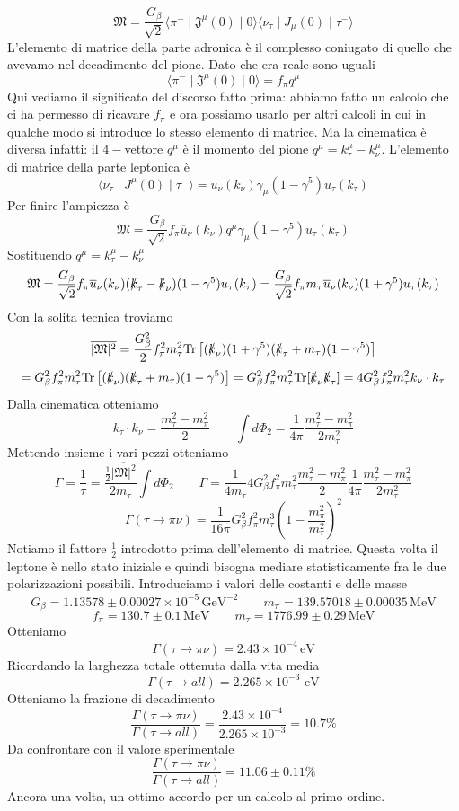 $$
\mathfrak{M} = \frac{G_\beta}{\sqrt{2}} \langle \pi^- \mid \mathfrak{J}^\mu (0) \mid 0 \rangle \langle \nu_\tau \mid J_\mu (0) \mid \tau^- \rangle
$$
L'elemento di matrice della parte adronica è il complesso coniugato di quello che avevamo nel decadimento del pione. Dato che era reale sono uguali
$$
\langle \pi^- \mid \mathfrak{J}^\mu (0) \mid 0 \rangle = f_\pi q^\mu
$$
Qui vediamo il significato del discorso fatto prima: abbiamo fatto un calcolo che ci ha permesso di ricavare $f_\pi$ e ora possiamo usarlo per altri calcoli in cui in qualche modo si introduce lo stesso elemento di matrice. Ma la cinematica è diversa infatti: il $4-$vettore $q^\mu$ è il momento del pione $q^\mu=k_\tau^\mu-k_\nu^\mu$. L'elemento di matrice della parte leptonica è
$$
\langle \nu_\tau \mid J^\mu (0) \mid \tau^- \rangle = \overline{u}_\nu (k_\nu) \gamma_\mu (1 - \gamma^5) u_\tau (k_\tau)
$$
Per finire l'ampiezza è
$$
\mathfrak{M} = \frac{G_\beta}{\sqrt{2}} f_\pi \overline{u}_\nu (k_\nu) q^\mu \gamma_\mu (1 - \gamma^5) u_\tau (k_\tau)
$$
Sostituendo $q^\mu=k_\tau^\mu-k_\nu^\mu$
$$
\mathfrak{M} = \frac{G_\beta}{\sqrt{2}} f_\pi \overline{u}_\nu (k_\nu) (\slashed{k}_\tau - \slashed{k}_\nu) (1 - \gamma^5) u_\tau (k_\tau) = \frac{G_\beta}{\sqrt{2}} f_\pi m_\tau \overline{u}_\nu (k_\nu) (1 + \gamma^5) u_\tau (k_\tau)
$$
Con la solita tecnica troviamo
$$
\overline{|\mathfrak{M}|^2} = \frac{G_\beta^2}{2} f_\pi^2 m_\tau^2 \text{Tr} \left[ (\slashed{k}_\nu)(1 + \gamma^5)(\slashed{k}_\tau + m_\tau)(1 - \gamma^5) \right]
$$
$$
= G_\beta^2 f_\pi^2 m_\tau^2 \text{Tr} \left[ (\slashed{k}_\nu)(\slashed{k}_\tau + m_\tau)(1 - \gamma^5) \right] = G_\beta^2 f_\pi^2 m_\tau^2 \text{Tr} [\slashed{k}_\nu \slashed{k}_\tau] = 4 G_\beta^2 f_\pi^2 m_\tau^2 k_\nu \cdot k_\tau
$$
Dalla cinematica otteniamo
$$
k_\tau \cdot k_\nu = \frac{m_\tau^2 - m_\pi^2}{2} \quad \quad \int d\Phi_2 = \frac{1}{4\pi} \frac{m_\tau^2 - m_\pi^2}{2m_\tau^2}
$$
Mettendo insieme i vari pezzi otteniamo
$$
\Gamma = \frac{1}{\tau} = \frac{\frac{1}{2}\overline{|\mathfrak{M}|^2}}{2m_\tau} \int d\Phi_2 \qquad \Gamma = \frac{1}{4m_\tau} 4G_\beta^2 f_\pi^2 m_\tau^2 \frac{m_\tau^2 - m_\pi^2}{2} \frac{1}{4\pi} \frac{m_\tau^2 - m_\pi^2}{2m_\tau^2}
$$
$$
\Gamma(\tau \to \pi\nu) = \frac{1}{16\pi} G_\beta^2 f_\pi^2 m_\tau^3 \left( 1 - \frac{m_\pi^2}{m_\tau^2} \right)^2
$$
Notiamo il fattore $\frac{1}{2}$ introdotto prima dell'elemento di matrice. Questa volta il leptone è nello stato iniziale e quindi bisogna mediare statisticamente fra le due polarizzazioni possibili. Introduciamo i valori delle costanti e delle masse
$$
G_\beta = 1.13578 \pm 0.00027 \times 10^{-5} \, \text{GeV}^{-2} \quad \quad m_\pi = 139.57018 \pm 0.00035 \, \text{MeV}
$$
$$
f_\pi = 130.7 \pm 0.1 \, \text{MeV} \quad \quad m_\tau = 1776.99 \pm 0.29 \, \text{MeV}
$$
Otteniamo
$$
\Gamma(\tau \to \pi\nu) = 2.43 \times 10^{-4} \, \text{eV}
$$
Ricordando la larghezza totale ottenuta dalla vita media
$$
\Gamma (\tau \to all) = 2.265 \times 10^{-3} \text{ eV}
$$
Otteniamo la frazione di decadimento
$$
\frac{\Gamma (\tau \to \pi\nu)}{\Gamma (\tau \to all)} = \frac{2.43 \times 10^{-4}}{2.265 \times 10^{-3}} = 10.7\%
$$
Da confrontare con il valore sperimentale
$$
\frac{\Gamma (\tau \to \pi\nu)}{\Gamma (\tau \to all)} = 11.06 \pm 0.11\%
$$
Ancora una volta, un ottimo accordo per un calcolo al primo ordine.

